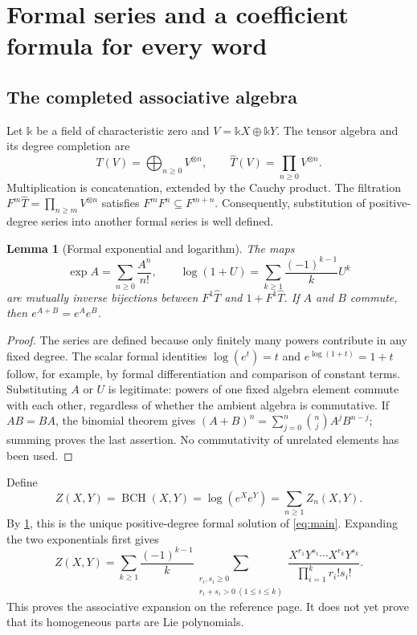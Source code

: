\documentclass[11pt]{article}
\numberwithin{equation}{section}
\newtheorem{lemma}[lemma]{Lemma}
\theoremstyle{definition}
\theoremstyle{remark}
\DeclareMathOperator{\BCH}{BCH}
\newcommand{\kk}{\mathbb{k}}
\begin{document}
\section{Formal series and a coefficient formula for every word}\label{sec:words}
\subsection{The completed associative algebra}
Let $\kk$ be a field of characteristic zero and $V=\kk X\oplus\kk Y$.
The tensor algebra and its degree completion are
\[
 T(V)=\bigoplus_{n\geq0}V^{\otimes n},\qquad
 \widehat T(V)=\prod_{n\geq0}V^{\otimes n}.
\]
Multiplication is concatenation, extended by the Cauchy product. The
filtration $F^m\widehat T=\prod_{n\geq m}V^{\otimes n}$ satisfies
$F^mF^n\subseteq F^{m+n}$. Consequently, substitution of positive-degree
series into another formal series is well defined.

\begin{lemma}[Formal exponential and logarithm]\label{lem:explog}
The maps
\begin{equation}\label{eq:formalexplog}
 \exp A=\sum_{n\geq0}\frac{A^n}{n!},\qquad
 \log(1+U)=\sum_{k\geq1}\frac{(-1)^{k-1}}kU^k
\end{equation}
are mutually inverse bijections between $F^1\widehat T$ and
$1+F^1\widehat T$. If $A$ and $B$ commute, then
$e^{A+B}=e^Ae^B$.
\end{lemma}
\begin{proof}
The series are defined because only finitely many powers contribute in
any fixed degree. The scalar formal identities
$\log(e^t)=t$ and $e^{\log(1+t)}=1+t$ follow, for example, by
formal differentiation and comparison of constant terms. Substituting
$A$ or $U$ is legitimate: powers of one fixed algebra element commute
with each other, regardless of whether the ambient algebra is
commutative. If $AB=BA$, the binomial theorem gives
$(A+B)^n=\sum_{j=0}^n\binom nj A^jB^{n-j}$; summing proves the last
assertion. No commutativity of unrelated elements has been used.
\end{proof}

Define
\begin{equation}\label{eq:defbch}
 Z(X,Y)=\BCH(X,Y)=\log(e^Xe^Y)=\sum_{n\geq1}Z_n(X,Y).
\end{equation}
By \cref{lem:explog}, this is the unique positive-degree formal solution
of \eqref{eq:main}. Expanding the two exponentials first gives
\begin{equation}\label{eq:associativeblocks}
 Z(X,Y)=\sum_{k\geq1}\frac{(-1)^{k-1}}k
 \sum_{\substack{r_i,s_i\geq0\\r_i+s_i>0\ (1\leq i\leq k)}}
 \frac{X^{r_1}Y^{s_1}\cdots X^{r_k}Y^{s_k}}
 {\prod_{i=1}^k r_i!s_i!}.
\end{equation}
This proves the associative expansion on the reference page. It does not
yet prove that its homogeneous parts are Lie polynomials.
\end{document}
